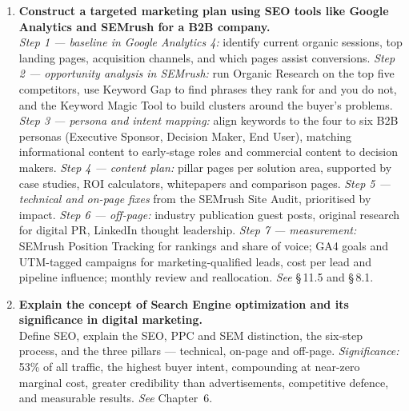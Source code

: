 \begin{enumerate}[leftmargin=2.2em,itemsep=1.4ex]
\item \textbf{Construct a targeted marketing plan using SEO tools like Google
      Analytics and SEMrush for a B2B company.}
      \\
      \emph{Step 1 --- baseline in Google Analytics 4:} identify current organic
      sessions, top landing pages, acquisition channels, and which pages assist
      conversions. \emph{Step 2 --- opportunity analysis in SEMrush:} run
      Organic Research on the top five competitors, use Keyword Gap to find
      phrases they rank for and you do not, and the Keyword Magic Tool to build
      clusters around the buyer's problems. \emph{Step 3 --- persona and intent
      mapping:} align keywords to the four to six B2B personas (Executive
      Sponsor, Decision Maker, End User), matching informational content to
      early-stage roles and commercial content to decision makers.
      \emph{Step 4 --- content plan:} pillar pages per solution area, supported
      by case studies, ROI calculators, whitepapers and comparison pages.
      \emph{Step 5 --- technical and on-page fixes} from the SEMrush Site Audit,
      prioritised by impact. \emph{Step 6 --- off-page:} industry publication
      guest posts, original research for digital PR, LinkedIn thought
      leadership. \emph{Step 7 --- measurement:} SEMrush Position Tracking for
      rankings and share of voice; GA4 goals and UTM-tagged campaigns for
      marketing-qualified leads, cost per lead and pipeline influence; monthly
      review and reallocation. \hfill\emph{See} \S\,11.5 and \S\,8.1.

\item \textbf{Explain the concept of Search Engine optimization and its
      significance in digital marketing.}
      \\
      Define SEO, explain the SEO, PPC and SEM distinction, the six-step process,
      and the three pillars --- technical, on-page and off-page.
      \emph{Significance:} 53\% of all traffic, the highest buyer intent,
      compounding at near-zero marginal cost, greater credibility than
      advertisements, competitive defence, and measurable results.
      \hfill\emph{See} Chapter~6.


\end{enumerate}
